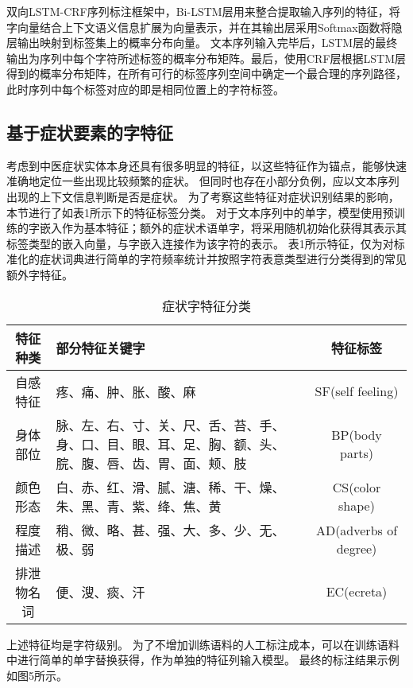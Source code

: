 双向LSTM-CRF序列标注框架中，Bi-LSTM层用来整合提取输入序列的特征，将字向量结合上下文语义信息扩展为向量表示，并在其输出层采用Softmax函数将隐层输出映射到标签集上的概率分布向量。
文本序列输入完毕后，LSTM层的最终输出为序列中每个字符所述标签的概率分布矩阵。最后，使用CRF层根据LSTM层得到的概率分布矩阵，在所有可行的标签序列空间中确定一个最合理的序列路径，此时序列中每个标签对应的即是相同位置上的字符标签。

\subsection{基于症状要素的字特征}
考虑到中医症状实体本身还具有很多明显的特征，以这些特征作为锚点，能够快速准确地定位一些出现比较频繁的症状。
但同时也存在小部分负例，应以文本序列出现的上下文信息判断是否是症状。
为了考察这些特征对症状识别结果的影响，本节进行了如表1所示下的特征标签分类。
对于文本序列中的单字，模型使用预训练的字嵌入作为基本特征；额外的症状术语单字，将采用随机初始化获得其表示其标签类型的嵌入向量，与字嵌入连接作为该字符的表示。
表1所示特征，仅为对标准化的症状词典进行简单的字符频率统计并按照字符表意类型进行分类得到的常见额外字特征。
\begin{table}[!htbp]
    \centering
    \footnotesize
    \setlength{\tabcolsep}{4pt}
    \renewcommand{\arraystretch}{1.2}
    \begin{tabular}{cp{7cm}c}
        \hline\hline
        特征种类 & 部分特征关键字 & 特征标签\\
        \hline
        自感特征 & 疼、痛、肿、胀、酸、麻 & SF(self feeling)\\
        \hline
        身体部位 & 脉、左、右、寸、关、尺、舌、苔、手、身、口、目、眼、耳、足、胸、额、头、脘、腹、唇、齿、胃、面、颊、肢 & BP(body parts)\\
        \hline
        颜色形态 & 白、赤、红、滑、腻、溏、稀、干、燥、朱、黑、青、紫、绛、焦、黄 & CS(color shape)\\
        \hline
        程度描述 & 稍、微、略、甚、强、大、多、少、无、极、弱 & AD(adverbs of degree) \\
        \hline
        排泄物名词 & 便、溲、痰、汗 & EC(ecreta)\\
        \hline\hline
    \end{tabular}
    \caption{症状字特征分类}
\end{table}

上述特征均是字符级别。
为了不增加训练语料的人工标注成本，可以在训练语料中进行简单的单字替换获得，作为单独的特征列输入模型。
最终的标注结果示例如图5所示。

